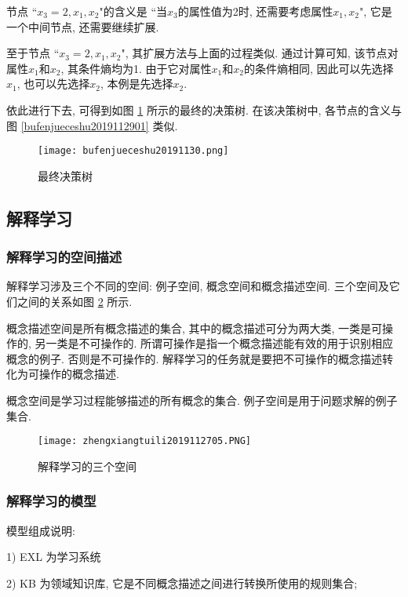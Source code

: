 节点 ``$x_3=2, x_1,x_2$"的含义是 ``当$x_3$的属性值为2时, 还需要考虑属性$x_1,x_2$", 它是一个中间节点, 还需要继续扩展.

至于节点 ``$x_3=2, x_1,x_2$", 其扩展方法与上面的过程类似. 通过计算可知, 该节点对属性$x_1$和$x_2$, 其条件熵均为1.
由于它对属性$x_1$和$x_2$的条件熵相同, 因此可以先选择$x_1$, 也可以先选择$x_2$, 本例是先选择$x_2$.

依此进行下去, 可得到如图 \ref{bufenjueceshu2019112902} 所示的最终的决策树.
在该决策树中, 各节点的含义与图 \ref{bufenjueceshu2019112901} 类似.
\begin{figure}[H]
\centering
\texttt{[image: bufenjueceshu20191130.png]}
\caption{最终决策树}
\label{bufenjueceshu2019112902}
\end{figure}
\subsection{解释学习}
\subsubsection{解释学习的空间描述}
解释学习涉及三个不同的空间: 例子空间, 概念空间和概念描述空间.
三个空间及它们之间的关系如图 \ref{AI32fig2705} 所示.

概念描述空间是所有概念描述的集合, 其中的概念描述可分为两大类, 一类是可操作的, 另一类是不可操作的.
所谓可操作是指一个概念描述能有效的用于识别相应概念的例子. 否则是不可操作的.
解释学习的任务就是要把不可操作的概念描述转化为可操作的概念描述.

概念空间是学习过程能够描述的所有概念的集合. 例子空间是用于问题求解的例子集合.
\begin{figure}[H]
\centering
\texttt{[image: zhengxiangtuili2019112705.PNG]}
\caption{解释学习的三个空间}
\label{AI32fig2705}
\end{figure}
\subsubsection{解释学习的模型}
模型组成说明:

1) EXL 为学习系统

2) KB 为领域知识库, 它是不同概念描述之间进行转换所使用的规则集合;

